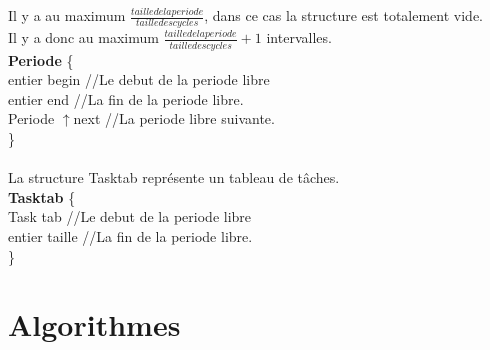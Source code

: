 \documentclass[11pt]{article}
\begin{document}
Il y a au maximum $\frac{taille de la periode}{taille des cycles}$, dans ce cas la structure est totalement vide.\\
Il y a donc au maximum $\frac{taille de la periode}{taille des cycles}+1$ intervalles.\\
\indent \textbf{Periode} \{ \\
    \indent \indent entier begin    \indent \indent//Le debut de la periode libre\\
    \indent \indent entier end \indent \indent //La fin de la periode libre.\\
    \indent \indent Periode $\uparrow$next \indent //La periode libre suivante.\\
\indent\}
\\\\
La structure Tasktab représente un tableau de tâches.\\
\indent \textbf{Tasktab} \{ \\
    \indent \indent Task tab    \indent \indent//Le debut de la periode libre\\
    \indent \indent entier taille \indent   //La fin de la periode libre.\\
\indent\}

\newpage
\section{Algorithmes}
\end{document}
